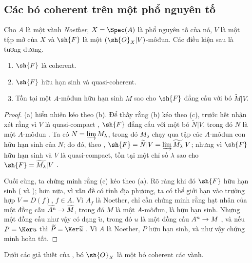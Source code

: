 \documentclass[oneside]{amsart}
\makeatletter
\newcommand{\ega@arrow}[2]{\mathchoice{#1}{#2}{#2}{#2}}
\renewcommand{\to}{\ega@arrow{\longrightarrow}{\rightarrow}}
\newcommand{\oldpage}[2][]{{\marginnote{\normalfont\textbf{#1}~|~#2}}\ignorespaces}
\let\EGAOriginalLabel\label
\renewcommand{\label}[1]{\phantomsection\EGAOriginalLabel{#1}}
\makeatother
\begin{document}
\subsection{Các bó coherent trên một phổ nguyên tố}
\label{subsection:I.1.5}

\begin{theorem}[1.5.1]
\label{I.1.5.1}
Cho $A$ là một vành \emph{Noether}, $X=\Spec(A)$ là phổ nguyên tố của nó, $V$ là một tập mở của $X$ và $\sh{F}$ là một $(\sh{O}_X|V)$-môđun.
Các điều kiện sau là tương đương.
\begin{enumerate}
  \item[{\rm(a)}] $\sh{F}$ là coherent.
  \item[{\rm(b)}] $\sh{F}$ hữu hạn sinh và quasi-coherent.
  \item[{\rm(c)}] Tồn tại một $A$-môđun hữu hạn sinh $M$ sao cho $\sh{F}$ đẳng cấu với bó $\widetilde{M}|V$.
\end{enumerate}
\end{theorem}

\begin{proof}
\oldpage[I]{93}
(a) hiển nhiên kéo theo (b).
Để thấy rằng (b) kéo theo (c), trước hết nhận xét rằng vì $V$ là quasi-compact , $\sh{F}$ đẳng cấu với một bó $\widetilde{N}|V$, trong đó $N$ là một $A$-môđun .
Ta có $N=\varinjlim M_\lambda$, trong đó $M_\lambda$ chạy qua tập các $A$-môđun con hữu hạn sinh của $N$; do đó, theo , $\sh{F}=\widetilde{N}|V=\varinjlim\widetilde{M_\lambda}|V$;
nhưng vì $\sh{F}$ hữu hạn sinh và $V$ là quasi-compact, tồn tại một chỉ số $\lambda$ sao cho $\sh{F}=\widetilde{M_\lambda}|V$ .

Cuối cùng, ta chứng minh rằng (c) kéo theo (a).
Rõ ràng khi đó $\sh{F}$ hữu hạn sinh ( và );
hơn nữa, vì vấn đề có tính địa phương, ta có thể giới hạn vào trường hợp $V=D(f)$, $f\in A$.
Vì $A_f$ là Noether, chỉ cần chứng minh rằng hạt nhân của một đồng cấu $\widetilde{A^n}\to\widetilde{M}$, trong đó $M$ là một $A$-môđun, là hữu hạn sinh.
Nhưng một đồng cấu như vậy có dạng $\widetilde{u}$, trong đó $u$ là một đồng cấu $A^n\to M$ , và nếu $P=\Ker u$ thì $\widetilde{P}=\Ker\widetilde{u}$ .
Vì $A$ là Noether, $P$ hữu hạn sinh, và như vậy chứng minh hoàn tất.
\end{proof}

\begin{corollary}[1.5.2]
\label{I.1.5.2}
Dưới các giả thiết của , bó $\sh{O}_X$ là một bó coherent các vành.
\end{corollary}
\end{document}
